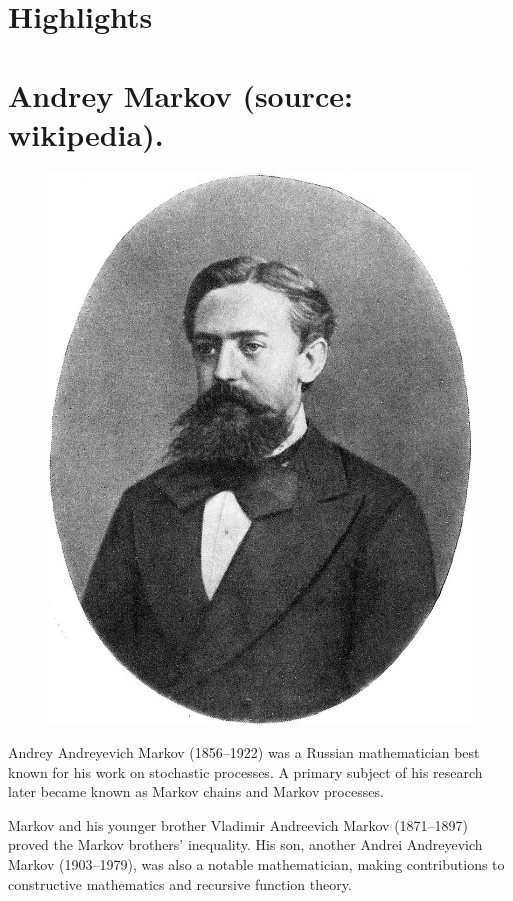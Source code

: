 \documentclass[english,graybox,envcountchap,envcountsame,sectrefs,shortlabels]{svmono}
\theoremstyle{style}
\begin{document}
\begin{subappendices}
\section*{Highlights}

\section{Andrey Markov (source: wikipedia).}

\begin{figure} \centering

\includegraphics[scale=0.1]{markov}

\end{figure}Andrey Andreyevich Markov (1856--1922) was a Russian
mathematician best known for his work on stochastic processes. A primary
subject of his research later became known as Markov chains and Markov
processes.

Markov and his younger brother Vladimir Andreevich Markov (1871--1897)
proved the Markov brothers' inequality. His son, another Andrei Andreyevich
Markov (1903--1979), was also a notable mathematician, making contributions
to constructive mathematics and recursive function theory.


\end{subappendices}
\end{document}
